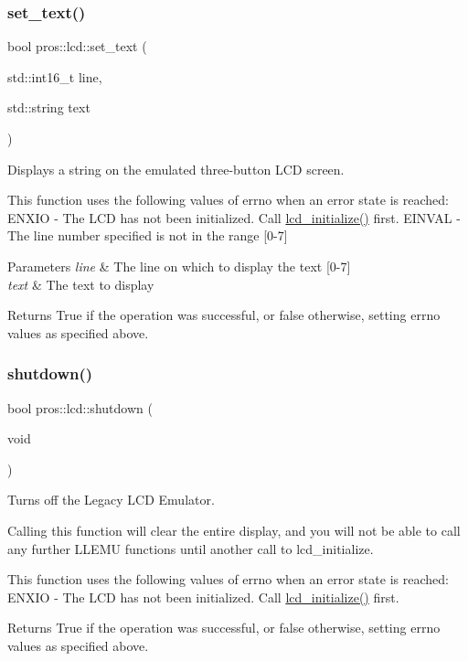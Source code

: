 \subsubsection{\texorpdfstring{set\_text()}{set\_text()}}
{\footnotesize\ttfamily bool pros\+::lcd\+::set\+\_\+text (\begin{DoxyParamCaption}\item[{std\+::int16\+\_\+t}]{line,  }\item[{std\+::string}]{text }\end{DoxyParamCaption})}



Displays a string on the emulated three-\/button L\+CD screen. 

This function uses the following values of errno when an error state is reached\+: E\+N\+X\+IO -\/ The L\+CD has not been initialized. Call \mbox{\hyperlink{llemu_8h_ae618494f080e95b506c0c18cb1ffb407}{lcd\+\_\+initialize()}} first. E\+I\+N\+V\+AL -\/ The line number specified is not in the range \mbox{[}0-\/7\mbox{]}


\begin{DoxyParams}{Parameters}
{\em line} & The line on which to display the text \mbox{[}0-\/7\mbox{]} \\
\hline
{\em text} & The text to display\\
\hline
\end{DoxyParams}
\begin{DoxyReturn}{Returns}
True if the operation was successful, or false otherwise, setting errno values as specified above. 
\end{DoxyReturn}
\mbox{\label{namespacepros_1_1lcd_a7aa9a422049011de193f54bce8cc95ed}} 
\subsubsection{\texorpdfstring{shutdown()}{shutdown()}}
{\footnotesize\ttfamily bool pros\+::lcd\+::shutdown (\begin{DoxyParamCaption}\item[{void}]{ }\end{DoxyParamCaption})}



Turns off the Legacy L\+CD Emulator. 

Calling this function will clear the entire display, and you will not be able to call any further L\+L\+E\+MU functions until another call to lcd\+\_\+initialize.

This function uses the following values of errno when an error state is reached\+: E\+N\+X\+IO -\/ The L\+CD has not been initialized. Call \mbox{\hyperlink{llemu_8h_ae618494f080e95b506c0c18cb1ffb407}{lcd\+\_\+initialize()}} first.

\begin{DoxyReturn}{Returns}
True if the operation was successful, or false otherwise, setting errno values as specified above. 
\end{DoxyReturn}
